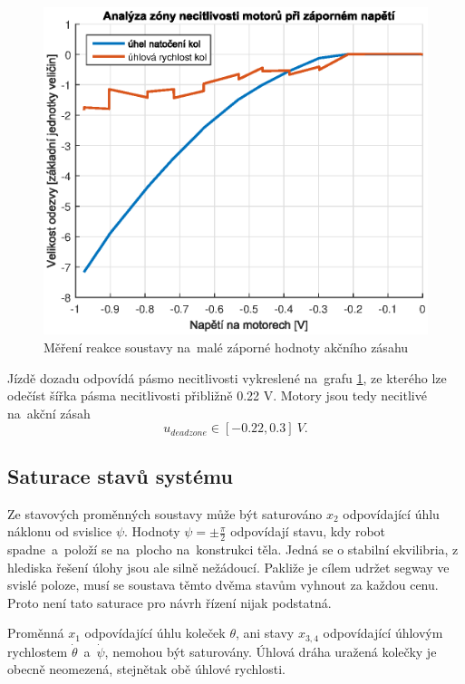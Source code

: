 \documentclass[conference]{IEEEtran}
\begin{document}
\begin{figure}[htbp]
    \centerline{\includegraphics[width=\linewidth]{deadzone_motory_vzad.eps}}
    \caption{Měření reakce soustavy na~malé záporné hodnoty akčního zásahu}
    \label{fig:deadzone_vzad}        
\end{figure}

Jízdě dozadu odpovídá pásmo necitlivosti vykreslené na~grafu \ref{fig:deadzone_vzad}, ze kterého
lze odečíst šířka pásma necitlivosti přibližně 0.22 \si{V}. Motory jsou tedy necitlivé
na~akční zásah
\begin{equation}
    u_{deadzone} \in [-0.22, 0.3] ~\si{V}.
    \label{eq:deadzone}
\end{equation}

\subsection{Saturace stavů systému}

Ze stavových proměnných soustavy může být saturováno $x_2$ odpovídající úhlu náklonu od svislice $\psi$.
Hodnoty $\psi = \pm \frac{\pi}{2}$ odpovídají stavu, kdy robot spadne~a~položí se na~plocho na~konstrukci těla.
Jedná se o stabilní ekvilibria, z hlediska řešení úlohy jsou ale silně nežádoucí. Pakliže je cílem udržet segway ve svislé poloze,
musí se soustava těmto dvěma stavům vyhnout za každou cenu. Proto není tato saturace pro návrh řízení nijak podstatná.

Proměnná $x_1$ odpovídající úhlu koleček $\theta$, ani stavy $x_{3,4}$ odpovídající úhlovým rychlostem $\dot{\theta}$~a~$\dot{\psi}$,
nemohou být saturovány. Úhlová dráha uražená kolečky je obecně neomezená, stejnětak obě úhlové rychlosti.
\end{document}
